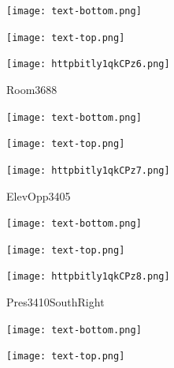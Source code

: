 \documentclass[letterpaper]{article}
\begin{document}
 \centerline{\texttt{[image: text-bottom.png]}} 
 
 \pagebreak 
{} 
 \vspace*{\fill} 
 
  \centerline{\texttt{[image: text-top.png]}} 
 
 \vspace{0.5in} 
 
 \begingroup 
 \centerline{\texttt{[image: httpbitly1qkCPz6.png]}} 
 \endgroup 
 \vspace*{\fill} 

 \hfill{\small Room3688} 

  \vspace{0.7in} 
 
 \centerline{\texttt{[image: text-bottom.png]}} 
 
 \pagebreak 
{} 
 \vspace*{\fill} 
 
  \centerline{\texttt{[image: text-top.png]}} 
 
 \vspace{0.5in} 
 
 \begingroup 
 \centerline{\texttt{[image: httpbitly1qkCPz7.png]}} 
 \endgroup 
 \vspace*{\fill} 

 \hfill{\small ElevOpp3405} 

  \vspace{0.7in} 
 
 \centerline{\texttt{[image: text-bottom.png]}} 
 
 \pagebreak 
{} 
 \vspace*{\fill} 
 
  \centerline{\texttt{[image: text-top.png]}} 
 
 \vspace{0.5in} 
 
 \begingroup 
 \centerline{\texttt{[image: httpbitly1qkCPz8.png]}} 
 \endgroup 
 \vspace*{\fill} 

 \hfill{\small Pres3410SouthRight} 

  \vspace{0.7in} 
 
 \centerline{\texttt{[image: text-bottom.png]}} 
 
 \pagebreak 
{} 
 \vspace*{\fill} 
 
  \centerline{\texttt{[image: text-top.png]}} 
 
 \vspace{0.5in} 
 
\end{document}
